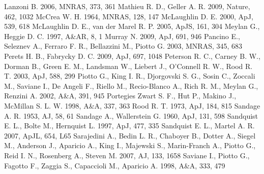 \begin{thebibliography}{99}
  Lanzoni B. 2006, MNRAS, 373, 361
  Mathieu R. D., Geller A. R. 2009, Nature, 462, 1032 
 McCrea
  W. H. 1964, MNRAS, 128, 147
  McLaughlin D. E. 2000, ApJ, 539, 618
 McLaughlin D. E., van der Marel R. P.
  2005, ApJS, 161, 304
  Meylan G., Heggie D. C. 1997, A\&AR, 8, 1
 Murray
  N. 2009, ApJ, 691, 946
  Pancino E., Seleznev A., Ferraro F. R., Bellazzini M., Piotto
  G. 2003, MNRAS, 345, 683 
  Perets H. B., Fabrycky D. C. 2009, ApJ, 697, 1048
  Peterson R. C., Carney B. W., Dorman B., Green E. M., Landsman W.,
  Liebert J., O'Connell R. W., Rood R. T. 2003, ApJ, 588, 299
  Piotto G., King I. R., Djorgovski S. G., Sosin C., Zoccali M.,
  Saviane I., De Angeli F., Riello M., Recio-Blanco A., Rich R. M.,
  Meylan G., Renzini A. 2002, A\&A, 391, 945
 Portegies Zwart S. F., Hut P.,
  Makino J., McMillan S. L. W. 1998, A\&A, 337, 363
  Rood
  R. T. 1973, ApJ, 184, 815
  Sandage A. R. 1953, AJ, 58, 61
  Sandage A., Wallerstein G. 1960, ApJ, 131, 598
 Sandquist E. L., Bolte M.,
  Hernquist L. 1997, ApJ, 477, 335
 Sandquist E. L., Martel A. R. 2007,
  ApJL, 654, L65
  Sarajedini A., Bedin L. R., Chaboyer B., Dotter  A., Siegel M.,
  Anderson J., Aparicio A., King I., Majewski S., Marin-Franch A.,
  Piotto G., Reid  I. N., Rosenberg A., Steven M. 2007, AJ, 133, 1658
  Saviane I., Piotto G., Fagotto F., Zaggia S., Capaccioli M.,
  Aparicio A. 1998, A\&A, 333, 479

\end{thebibliography}
